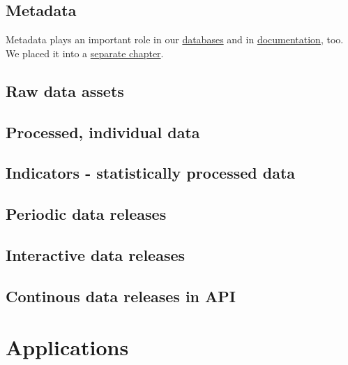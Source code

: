 \documentclass[
  fontsize=13pt,
  english,
  a4paper,
  openany, a4paper, oneside]{book}
\begin{document}
\hypertarget{storage-metadata}{%
\section{Metadata}\label{storage-metadata}}

Metadata plays an important role in our \protect\hyperlink{data-storage}{databases} and in \protect\hyperlink{documentation}{documentation}, too. We placed it into a \protect\hyperlink{metadata}{separate chapter}.

\hypertarget{dta-raw}{%
\section{Raw data assets}\label{dta-raw}}

\hypertarget{processed-individual-data}{%
\section{Processed, individual data}\label{processed-individual-data}}

\hypertarget{indicators---statistically-processed-data}{%
\section{Indicators - statistically processed data}\label{indicators---statistically-processed-data}}

\hypertarget{periodic-data-releases}{%
\section{Periodic data releases}\label{periodic-data-releases}}

\hypertarget{interactive-data-releases}{%
\section{Interactive data releases}\label{interactive-data-releases}}

\hypertarget{continous-data-releases-in-api}{%
\section{Continous data releases in API}\label{continous-data-releases-in-api}}

\hypertarget{applications}{%
\chapter{Applications}\label{applications}}
\end{document}
